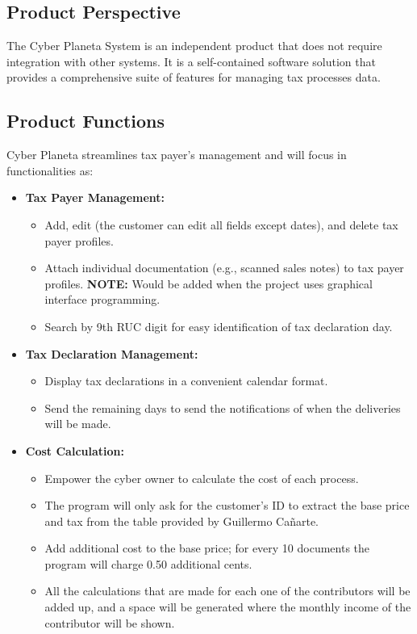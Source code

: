\documentclass[12pt,a4paper, twosite]{article}
\begin{document}
\subsection{Product Perspective}
\label{sec:org24980a8}

The Cyber Planeta System is an independent product that does not require integration with other systems. It is a self-contained software solution that provides a comprehensive suite of features for managing tax processes data.


\subsection{Product Functions}
\label{sec:orgaf51da6}

Cyber Planeta streamlines tax payer's management and will focus in functionalities as: \begin{itemize}
\item \textbf{Tax Payer Management:}
\begin{itemize}
\item Add, edit (the customer can edit all fields except dates), and delete tax payer profiles.
\item Attach individual documentation (e.g., scanned sales notes) to tax payer profiles. 
\textbf{NOTE:} Would be added when the project uses graphical interface programming.
\item Search by 9th RUC digit for easy identification of tax declaration day.
\end{itemize}
\item \textbf{Tax Declaration Management:}
\begin{itemize}
\item Display tax declarations in a convenient calendar format.
\item Send the remaining days to send the notifications of when the deliveries will be made. 
\end{itemize}
\item \textbf{Cost Calculation:}
\begin{itemize}
\item Empower the cyber owner to calculate the cost of each process.
\item The program will only ask for the customer's ID to extract the base price and tax from the table provided by Guillermo Cañarte.
\item Add additional cost to the base price; for every 10 documents the program will charge 0.50 additional cents.
\item All the calculations that are made for each one of the contributors will be added up, and a space will be generated where the monthly income of the contributor will be shown.


\end{itemize}
\end{itemize}
\end{document}
